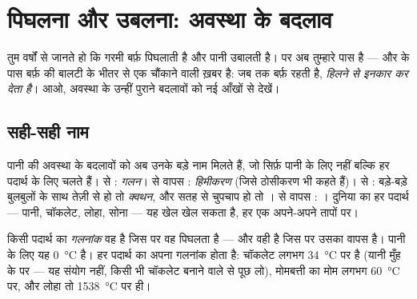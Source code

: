 \chapter{पिघलना और उबलना: अवस्था के बदलाव}\label{ch:g4:changes-of-state}

तुम वर्षों से जानते हो कि गरमी बर्फ़ पिघलाती है और पानी उबालती है। पर
अब तुम्हारे पास  है --- और  के पास  बर्फ़ की
बालटी के भीतर से एक चौंकाने वाली ख़बर है: जब तक बर्फ़  रहती है,
 \emph{हिलने से इनकार कर देता है}। आओ, अवस्था के उन्हीं पुराने
बदलावों को नई आँखों से देखें।

\section{सही-सही नाम}

पानी की अवस्था के बदलावों को अब उनके बड़े नाम मिलते हैं, जो सिर्फ़
पानी के लिए नहीं बल्कि हर पदार्थ के लिए चलते हैं।  से :
\emph{गलन}।  से वापस :
\emph{हिमीकरण} (जिसे ठोसीकरण भी कहते हैं)।  से
: बड़े-बड़े बुलबुलों के साथ तेज़ी से हो तो
\emph{क्वथन}, और सतह से चुपचाप हो तो ।  से
वापस : । दुनिया का हर पदार्थ --- पानी, चॉकलेट, लोहा, सोना
--- यह खेल खेल सकता है, हर एक अपने-अपने तापों पर।

\begin{definition}[गलनांक]\label{def:g4:changes-of-state:melting-point}
किसी पदार्थ का \emph{गलनांक} वह  है जिस पर वह
पिघलता है --- और वही  है जिस पर उसका  वापस  है। पानी के
लिए यह \qty{0}{\celsius} है। हर पदार्थ का अपना गलनांक होता है:
चॉकलेट लगभग \qty{34}{\celsius} पर  है (यानी मुँह के  पर ---
यह संयोग नहीं, किसी भी चॉकलेट बनाने वाले से पूछ लो), मोमबत्ती का मोम
लगभग \qty{60}{\celsius} पर, और लोहा तो \qty{1538}{\celsius} पर ही।
\end{definition}

